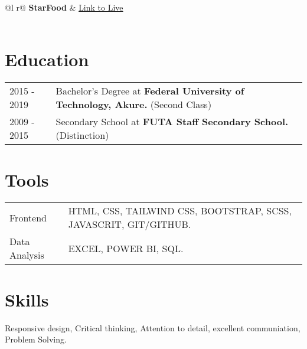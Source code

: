 \documentclass[a4paper,12pt]{article}
\begin{document}
\begin{tabularx}{\linewidth}{ @{}l r@{} }
\textbf{StarFood} & \hfill \href{https://harbystardev.github.io/StarFood/}{Link to Live} \\[3.75pt]
  \\
\end{tabularx}

\section{Education}
\begin{tabularx}{\linewidth}{@{}l X@{}}	
2015 - 2019 & Bachelor's Degree at \textbf{Federal University of Technology, Akure.} \hfill \normalsize (Second Class) \\

2009 - 2015 & Secondary School at \textbf{FUTA Staff Secondary School.} \hfill (Distinction) \\ 

\end{tabularx}

\section{Tools}
\begin{tabularx}{\linewidth}{@{}l X@{}}
Frontend &  \normalsize{HTML, CSS, TAILWIND CSS, BOOTSTRAP, SCSS, JAVASCRIT, GIT/GITHUB.}\\
Data Analysis  &  \normalsize{EXCEL, POWER BI, SQL.}\\  
\end{tabularx}

\section{Skills}

Responsive design, Critical thinking, Attention to detail, excellent communiation, Problem Solving.
\end{document}

